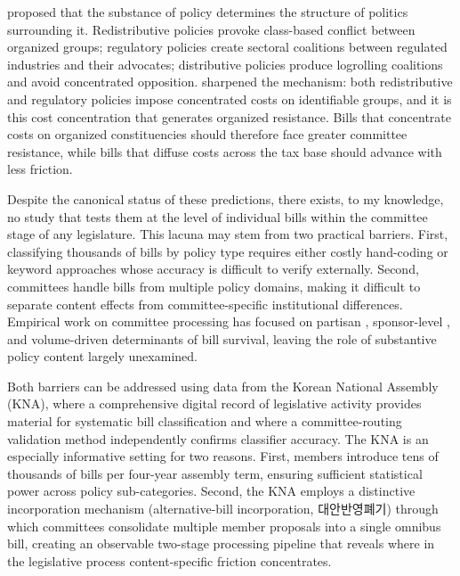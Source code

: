 \documentclass[11pt]{article}
\begin{document}
\citet{lowi1964} proposed that the substance of policy determines the structure of politics surrounding it. Redistributive policies provoke class-based conflict between organized groups; regulatory policies create sectoral coalitions between regulated industries and their advocates; distributive policies produce logrolling coalitions and avoid concentrated opposition. \citet{wilson1980} sharpened the mechanism: both redistributive and regulatory policies impose concentrated costs on identifiable groups, and it is this cost concentration that generates organized resistance. Bills that concentrate costs on organized constituencies should therefore face greater committee resistance, while bills that diffuse costs across the tax base should advance with less friction.

Despite the canonical status of these predictions, there exists, to my knowledge, no study that tests them at the level of individual bills within the committee stage of any legislature. This lacuna may stem from two practical barriers. First, classifying thousands of bills by policy type requires either costly hand-coding or keyword approaches whose accuracy is difficult to verify externally. Second, committees handle bills from multiple policy domains, making it difficult to separate content effects from committee-specific institutional differences. Empirical work on committee processing has focused on partisan \citep{cox2005}, sponsor-level \citep{volden2016, bucchianeri2024}, and volume-driven \citep{krutz2005} determinants of bill survival, leaving the role of substantive policy content largely unexamined.

Both barriers can be addressed using data from the Korean National Assembly (KNA), where a comprehensive digital record of legislative activity provides material for systematic bill classification and where a committee-routing validation method independently confirms classifier accuracy. The KNA is an especially informative setting for two reasons. First, members introduce tens of thousands of bills per four-year assembly term, ensuring sufficient statistical power across policy sub-categories. Second, the KNA employs a distinctive incorporation mechanism (alternative-bill incorporation, 대안반영폐기) through which committees consolidate multiple member proposals into a single omnibus bill, creating an observable two-stage processing pipeline that reveals where in the legislative process content-specific friction concentrates.
\end{document}
